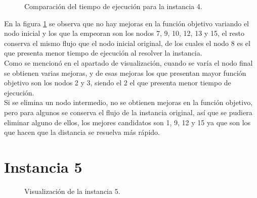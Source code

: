 \documentclass[12pt]{article}
\begin{document}
\newpage

\begin{figure}[H]
\centering
{}

\caption{Comparación del tiempo de ejecución para la instancia 4.} \label{f9}
\end{figure}

En la figura \ref{f9} se observa que no hay mejoras en la función objetivo variando el nodo inicial y los que la empeoran son los nodos 7, 9, 10, 12, 13 y 15, el resto conserva el mismo flujo que el nodo inicial original, de los cuales el nodo 8 es el que presenta menor tiempo de ejecución al resolver la instancia. \\

Como se mencionó en el apartado de visualización, cuando se varía el nodo final se obtienen varias mejoras, y de esas mejoras los que presentan mayor función objetivo son los nodos 2 y 3, siendo el 2 el que presenta menor tiempo de ejecución.\\

Si se elimina un nodo intermedio, no se obtienen mejoras en la función objetivo, pero para algunos se conserva el flujo de la instancia original, así que se pudiera eliminar alguno de ellos, los mejores candidatos son 1, 9, 12 y 15 ya que son los que hacen que la distancia se resuelva más rápido. 

\newpage
\section*{Instancia 5}

\begin{figure}[H]
\centering
{}

\caption{Visualización de la instancia 5.} \label{f10}
\end{figure}
\end{document}
